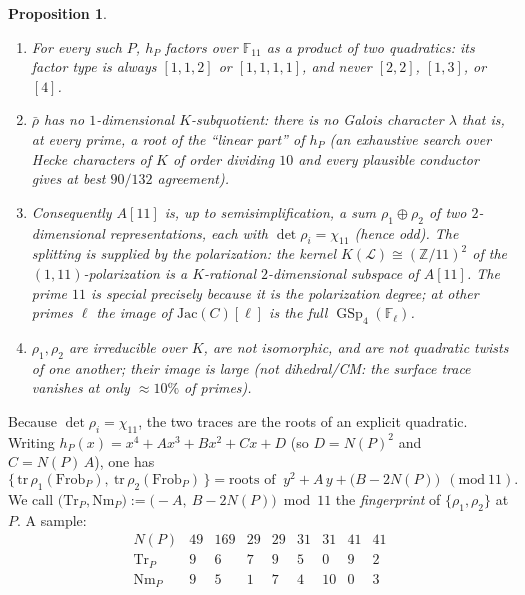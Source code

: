 \documentclass[11pt]{article}
\newtheorem{proposition}{Proposition}
\newcommand{\bbF}{\mathbb{F}}
\newcommand{\bbZ}{\mathbb{Z}}
\newcommand{\rhob}{\bar{\rho}}
\newcommand{\Frob}{\mathrm{Frob}}
\newcommand{\Jac}{\mathrm{Jac}}
\newcommand{\Tr}{\mathrm{Tr}}
\newcommand{\Nm}{\mathrm{Nm}}
\newcommand{\chicyc}{\chi_{11}}
\DeclareMathOperator{\GSp}{GSp}
\begin{document}
\begin{proposition}\label{prop:struct}
\begin{enumerate}
\item[(a)] For every such $P$, $h_P$ factors over $\bbF_{11}$ as a product of two quadratics:
its factor type is always $[1,1,2]$ or $[1,1,1,1]$, and never $[2,2]$, $[1,3]$, or $[4]$.
\item[(b)] $\rhob$ has no $1$-dimensional $K$-subquotient: there is no Galois character
$\lambda$ that is, at every prime, a root of the ``linear part'' of $h_P$ (an exhaustive search
over Hecke characters of $K$ of order dividing $10$ and every plausible conductor gives at best
$90/132$ agreement).
\item[(c)] Consequently $A[11]$ is, up to semisimplification, a sum
$\rho_1\oplus\rho_2$ of two $2$-dimensional representations, each with
$\det\rho_i=\chicyc$ (hence odd). The splitting is supplied by the polarization: the kernel
$K(\mathcal L)\cong(\bbZ/11)^2$ of the $(1,11)$-polarization is a $K$-rational $2$-dimensional
subspace of $A[11]$. The prime $11$ is special precisely because it is the polarization degree;
at other primes $\ell$ the image of $\Jac(C)[\ell]$ is the full $\GSp_4(\bbF_\ell)$.
\item[(d)] $\rho_1,\rho_2$ are irreducible over $K$, are not isomorphic, and are not quadratic
twists of one another; their image is large (not dihedral/CM: the surface trace vanishes at
only $\approx 10\%$ of primes).
\end{enumerate}
\end{proposition}

Because $\det\rho_i=\chicyc$, the two traces are the roots of an explicit quadratic. Writing
$h_P(x)=x^4+Ax^3+Bx^2+Cx+D$ (so $D=N(P)^2$ and $C=N(P)\,A$), one has
\begin{equation}\label{eq:fingerprint}
\{\,\mathrm{tr}\,\rho_1(\Frob_P),\ \mathrm{tr}\,\rho_2(\Frob_P)\,\}
=\text{roots of }\ y^2 + A\,y + \big(B-2N(P)\big)\ \ (\mathrm{mod}\ 11).
\end{equation}
We call $\big(\Tr_P,\Nm_P\big):=\big(-A,\ B-2N(P)\big)\bmod 11$ the {\it fingerprint} of
$\{\rho_1,\rho_2\}$ at $P$. A sample:
\[
\begin{array}{c|cccccccc}
N(P) & 49 & 169 & 29 & 29 & 31 & 31 & 41 & 41\\\hline
\Tr_P & 9 & 6 & 7 & 9 & 5 & 0 & 9 & 2\\
\Nm_P & 9 & 5 & 1 & 7 & 4 & 10 & 0 & 3
\end{array}
\]
\end{document}

